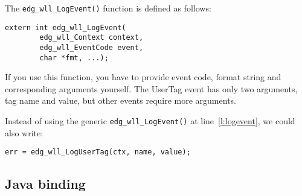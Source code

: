The \verb'edg_wll_LogEvent()' function is defined as follows:
\begin{lstlisting}[numbers=none]
extern int edg_wll_LogEvent(
        edg_wll_Context context,
        edg_wll_EventCode event,
        char *fmt, ...);
\end{lstlisting}
If you use this function, you have to provide event code, format
string and corresponding arguments yourself. The UserTag event has
only two arguments, tag name and value, but other events require more
arguments. 

Instead of using the generic \verb'edg_wll_LogEvent()' at line~\ref{l:logevent}, we could also
write:
\begin{lstlisting}
err = edg_wll_LogUserTag(ctx, name, value);
\end{lstlisting}

\subsection{Java binding}

